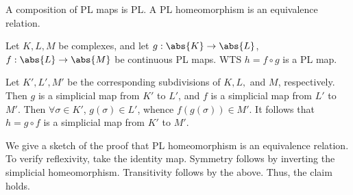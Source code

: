 \begin{problem}[15.21]
  A composition of PL maps is PL. A PL homeomorphism is an equivalence relation.
\end{problem}
\begin{solution}
  Let $K,L,M$ be complexes, and let $g : \abs{K} \to \abs{L}$, $f : \abs{L} \to
  \abs{M}$ be continuous PL maps. WTS $h = f \circ g$ is a PL map.

  Let $K', L', M'$ be the corresponding subdivisions of $K,L,$ and $M$,
  respectively. Then $g$ is a simplicial map from $K'$ to $L'$, and $f$ is a
  simplicial map from $L'$ to $M'$. Then $\forall \sigma \in K'$, $g(\sigma) \in
  L'$, whence $f(g(\sigma)) \in M'$. It follows that $h = g \circ f$ is a
  simplicial map from $K'$ to $M'$.

  We give a sketch of the proof that PL homeomorphism is an equivalence
  relation. To verify reflexivity, take the identity map. Symmetry follows by
  inverting the simplicial homeomorphism. Transitivity follows by the above.
  Thus, the claim holds.
\end{solution}
